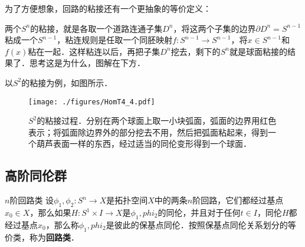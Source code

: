 为了方便想象，回路的粘接还有一个更抽象的等价定义：

\begin{exercise}{}
两个$S^n$的粘接，就是各取一个道路连通子集$D^n$，将这两个子集的边界$\partial D^n=S^{n-1}$粘成一个$S^{n-1}$，粘连规则是任取一个同胚映射$f:S^{n-1}\rightarrow S^{n-1}$，将$x\in S^{n-1}$和$f(x)$粘在一起．这样粘连以后，再把子集$D^n$挖去，剩下的$S^n$就是球面粘接的结果了．思考这是为什么，图解在下方．
\end{exercise}

以$S^2$的粘接为例，如图所示．

\begin{figure}[ht]
\centering
\texttt{[image: ./figures/HomT4\_4.pdf]}
\caption{$S^2$的粘接过程．分别在两个球面上取一小块弧面，弧面的边界用红色表示；将弧面除边界外的部分挖去不用，然后把弧面粘起来，得到一个葫芦表面一样的东西，经过适当的同伦变形得到一个球面．} \label{HomT4_fig4}
\end{figure}

\subsection{高阶同伦群}

\begin{definition}{$n$阶回路类}
设$\phi_1, \phi_2:S^n\rightarrow X$是拓扑空间$X$中的两条$n$阶回路，它们都经过基点$x_0\in X$，那么如果$H:S^1\times I\rightarrow X$是$\phi_1, phi_2$的同伦，并且对于任何$t\in I$，同伦$H$都经过基点$x_0$，那么称$\phi_1, phi_2$是彼此的保基点同伦．按照保基点同伦关系划分的等价类，称为\textbf{回路类}．
\end{definition}


